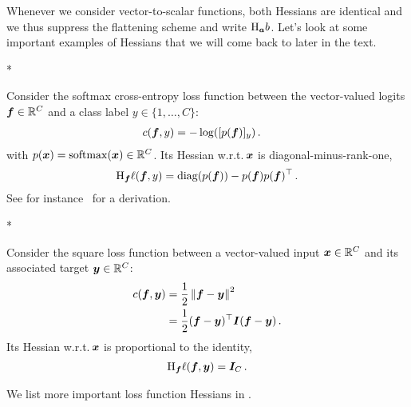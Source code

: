 Whenever we consider vector-to-scalar functions, both Hessians are identical and we thus suppress the flattening scheme and write $\mathrm{H}_{{\bm{a}}}b$. Let's look at some important examples of Hessians that we will come back to later in the text.

\switchcolumn[1]*
\switchcolumn[0]

\begin{example}
  Consider the softmax cross-entropy loss function between the vector-valued logits ${\bm{f}} \in {\mathbb{R}}^C$ and a class label $y \in \{1, \dots, C\}$:
  \begin{align*}
    c({\bm{f}}, y)
     & =
    -\log([p({\bm{f}})]_y)\,.
  \end{align*}
  with $p({\bm{x}}) = \mathrm{softmax}({\bm{x}}) \in {\mathbb{R}}^C$.
  Its Hessian w.r.t.\,${\bm{x}}$ is diagonal-minus-rank-one,
  \begin{align*}
    \mathrm{H}_{{\bm{f}}} \ell({\bm{f}}, y)
    =
    \operatorname{diag}(p({\bm{f}})) - p({\bm{f}}) p({\bm{f}})^\top\,.
  \end{align*}
  See for instance~\cite{dangel2020modular} for a derivation.
\end{example}

\switchcolumn[1]*

\switchcolumn[0]
\begin{example}\label{ex:square_loss_hessian}
  Consider the square loss function between a vector-valued input ${\bm{x}} \in {\mathbb{R}}^C$ and its associated target ${\bm{y}} \in {\mathbb{R}}^C$:
  \begin{align*}
    c({\bm{f}}, {\bm{y}})
     & =
    \frac{1}{2}\left\lVert
    {\bm{f}} - {\bm{y}}
    \right\rVert^2
    \\
     & =
    \frac{1}{2}({\bm{f}} - {\bm{y}})^{\top} {\bm{I}} ({\bm{f}} - {\bm{y}})\,.
  \end{align*}
  Its Hessian w.r.t.\,${\bm{x}}$ is proportional to the identity,
  \begin{align*}
    \mathrm{H}_{{\bm{f}}} \ell({\bm{f}}, {\bm{y}})
    =
    {\bm{I}}_C\,.
  \end{align*}
\end{example}

We list more important loss function Hessians in .

